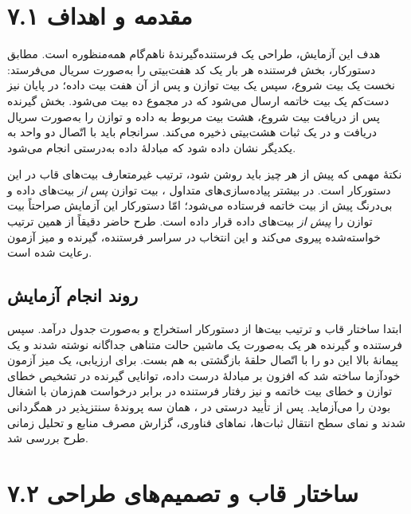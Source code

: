 \documentclass[12pt,a4paper]{article}
\begin{document}

	\section*{۷.۱ مقدمه و اهداف}
	هدف این آزمایش، طراحی یک فرستنده‌گیرندهٔ ناهم‌گام همه‌منظوره است. مطابق دستورکار، بخش فرستنده هر بار یک کد هفت‌بیتی  را به‌صورت سریال می‌فرستد: نخست یک بیت شروع، سپس یک بیت توازن و پس از آن هفت بیت داده؛ در پایان نیز دست‌کم یک بیت خاتمه ارسال می‌شود که در مجموع ده بیت می‌شود. بخش گیرنده پس از دریافت بیت شروع، هشت بیت مربوط به داده و توازن را به‌صورت سریال دریافت و در یک ثبات هشت‌بیتی ذخیره می‌کند. سرانجام باید با اتّصال دو واحد به یکدیگر نشان داده شود که مبادلهٔ داده به‌درستی انجام می‌شود.

	نکتهٔ مهمی که پیش از هر چیز باید روشن شود، ترتیب غیرمتعارف بیت‌های قاب در این دستورکار است. در بیشتر پیاده‌سازی‌های متداول ، بیت توازن \emph{پس از} بیت‌های داده و بی‌درنگ پیش از بیت خاتمه فرستاده می‌شود؛ امّا دستورکار این آزمایش صراحتاً بیت توازن را \emph{پیش از} بیت‌های داده قرار داده است. طرح حاضر دقیقاً از همین ترتیب خواسته‌شده پیروی می‌کند و این انتخاب در سراسر فرستنده، گیرنده و میز آزمون رعایت شده است.

	\subsection*{روند انجام آزمایش}
	ابتدا ساختار قاب و ترتیب بیت‌ها از دستورکار استخراج و به‌صورت جدول درآمد. سپس فرستنده و گیرنده هر یک به‌صورت یک ماشین حالت متناهی جداگانه نوشته شدند و یک پیمانهٔ بالا این دو را با اتّصال حلقهٔ بازگشتی به هم بست. برای ارزیابی، یک میز آزمون خودآزما ساخته شد که افزون بر مبادلهٔ درست داده، توانایی گیرنده در تشخیص خطای توازن و خطای بیت خاتمه و نیز رفتار فرستنده در برابر درخواست هم‌زمان با اشغال بودن را می‌آزماید. پس از تأیید درستی در ، همان سه پروندهٔ سنتز‌پذیر در  همگردانی شدند و نمای سطح انتقال ثبات‌ها، نماهای فناوری، گزارش مصرف منابع و تحلیل زمانی طرح بررسی شد.

	\section*{۷.۲ ساختار قاب و تصمیم‌های طراحی}
\end{document}
